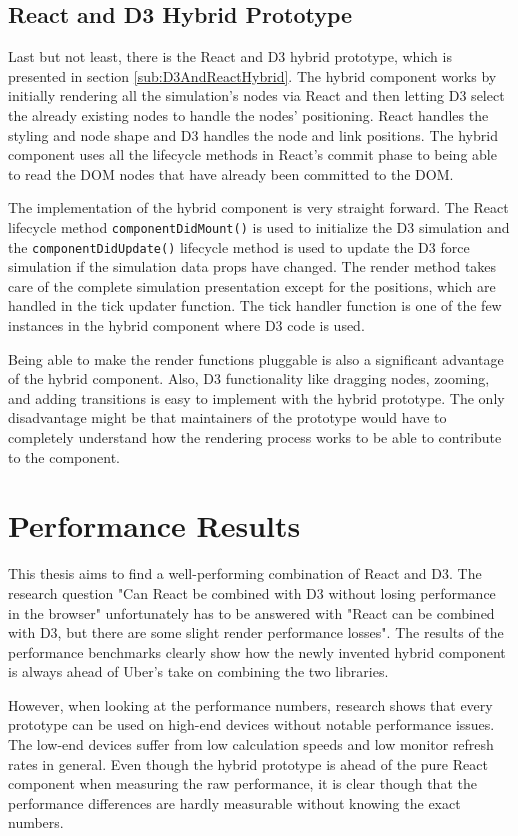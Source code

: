 \subsection{React and D3 Hybrid Prototype}

Last but not least, there is the React and D3 hybrid prototype, which is presented in section \ref{sub:D3AndReactHybrid}. The hybrid component works by initially rendering all the simulation's nodes via React and then letting D3 select the already existing nodes to handle the nodes' positioning. React handles the styling and node shape and D3 handles the node and link positions. The hybrid component uses all the lifecycle methods in React's commit phase to being able to read the DOM nodes that have already been committed to the DOM. 

The implementation of the hybrid component is very straight forward. The React lifecycle method \texttt{componentDidMount()} is used to initialize the D3 simulation and the \texttt{componentDidUpdate()} lifecycle method is used to update the D3 force simulation if the simulation data props have changed. The render method takes care of the complete simulation presentation except for the positions, which are handled in the tick updater function. The tick handler function is one of the few instances in the hybrid component where D3 code is used.

Being able to make the render functions pluggable is also a significant advantage of the hybrid component. Also, D3 functionality like dragging nodes, zooming, and adding transitions is easy to implement with the hybrid prototype. The only disadvantage might be that maintainers of the prototype would have to completely understand how the rendering process works to be able to contribute to the component.

\section{Performance Results}

This thesis aims to find a well-performing combination of React and D3. The research question "Can React be combined with D3 without losing performance in the browser" unfortunately has to be answered with "React can be combined with D3, but there are some slight render performance losses". The results of the performance benchmarks clearly show how the newly invented hybrid component is always ahead of Uber's take on combining the two libraries. 

However, when looking at the performance numbers, research shows that every prototype can be used on high-end devices without notable performance issues. The low-end devices suffer from low calculation speeds and low monitor refresh rates in general. Even though the hybrid prototype is ahead of the pure React component when measuring the raw performance, it is clear though that the performance differences are hardly measurable without knowing the exact numbers.

